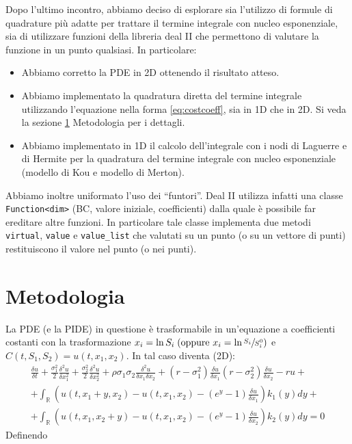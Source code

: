 \documentclass[a4paper,10pt]{article}
\newcommand{\der}[2]{\frac{\delta #1}{\delta #2}}
\newcommand{\dder}[2]{\frac{\delta^2 #1}{\delta #2^2}}
\newcommand{\dmix}[3]{\frac{\delta^2 #1}{\delta #2 \delta #3}}
\begin{document}
Dopo l'ultimo incontro, abbiamo deciso di esplorare sia l'utilizzo di formule di quadrature più adatte per trattare il termine integrale con nucleo esponenziale, sia di utilizzare funzioni della libreria deal II che permettono di valutare la funzione in un punto qualsiasi. In particolare:

\begin{itemize}
 \item Abbiamo corretto la PDE in 2D ottenendo il risultato atteso.
 \item Abbiamo implementato la quadratura diretta del termine integrale utilizzando l'equazione nella forma \eqref{eq:costcoeff}, sia in 1D che in 2D. Si veda la sezione \ref{sec:metod} Metodologia per i dettagli.
 \item Abbiamo implementato in 1D il calcolo dell'integrale con i nodi di Laguerre e di Hermite per la quadratura del termine integrale con nucleo esponenziale (modello di Kou e modello di Merton).
\end{itemize}

Abbiamo inoltre uniformato l'uso dei ``funtori''. Deal II utilizza infatti una classe \verb!Function<dim>! (BC, valore iniziale, coefficienti) dalla quale è possibile far ereditare altre funzioni. In particolare tale classe implementa due metodi \verb!virtual!, \verb!value! e \verb!value_list! che valutati su un punto (o su un vettore di punti) restituiscono il valore nel punto (o nei punti). 

\section{Metodologia}
\label{sec:metod}
La PDE (e la PIDE) in questione è trasformabile in un'equazione a coefficienti costanti con la trasformazione $x_i=\ln{S_i} \; (\text{oppure } x_i=\ln{\sfrac{S_i}{S_i^0}})$ e $C(t,S_1,S_2)=u(t,x_1,x_2)$. In tal caso diventa (2D):
{
\begin{multline}
 \der{u}{t}+\frac{\sigma_1^2}{2}\dder{u}{x_1}+\frac{\sigma_2^2}{2}\dder{u}{x_2}+\rho\sigma_1\sigma_2\dmix{u}{x_1}{x_2}+
 \left(r-\sigma_1^2\right)\der{u}{x_1}
 \left(r-\sigma_2^2\right)\der{u}{x_2}-ru+\\
 +\int_\mathbb{R}\left( u(t,x_1+y,x_2)-u(t,x_1,x_2)-(e^y-1)\der{u}{x_1}\right)k_1(y)dy+\\
 +\int_\mathbb{R}\left( u(t,x_1,x_2+y)-u(t,x_1,x_2)-(e^y-1)\der{u}{x_2}\right)k_2(y)dy=0
 \label{eq:costcoeff}
 \end{multline}
}
Definendo 
\end{document}

